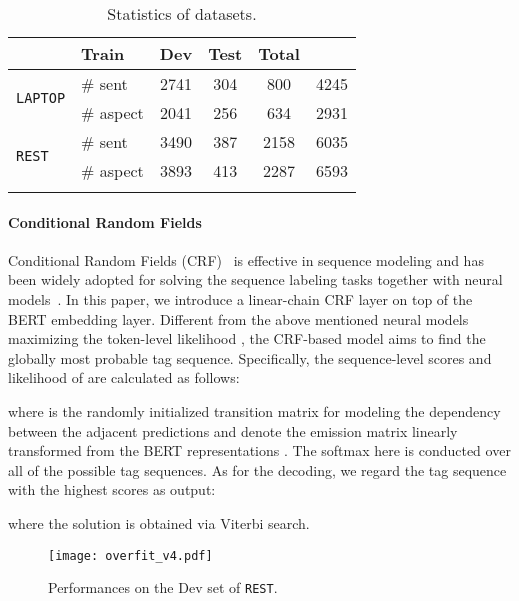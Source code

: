 \documentclass[11pt,a4paper]{article}
\begin{document}
\begin{table}[]
    \centering
    \begin{small}
    \begin{tabular}{ll|c|c|c|c}
    \Xhline{2\arrayrulewidth}
        \multicolumn{2}{c|}{Dataset} & Train & Dev & Test & Total  \\ \hline
         \multirow{2}{*}{\texttt{LAPTOP}} & \# sent & 2741 & 304 & 800 & 4245 \\ 
        & \# aspect & 2041 & 256 & 634 & 2931 \\ \hline
        \multirow{2}{*}{\texttt{REST}} & \# sent & 3490 & 387 & 2158 & 6035 \\ 
        & \# aspect & 3893 & 413 & 2287 & 6593 \\ 
    \Xhline{2\arrayrulewidth}
    \end{tabular}
    \end{small}
    \caption{Statistics of datasets.}
    \label{tab:dataset}
\end{table}

\paragraph{Conditional Random Fields} Conditional Random Fields (CRF)~\cite{lafferty2001conditional} is effective in sequence modeling and has been widely adopted for solving the sequence labeling tasks together with neural models~\cite{huang2015bidirectional,lample-etal-2016-neural,ma-hovy-2016-end}. In this paper, we introduce a linear-chain CRF layer on top of the BERT embedding layer. Different from the above mentioned neural models maximizing the token-level likelihood , the CRF-based model aims to find the globally most probable tag sequence. Specifically, the sequence-level scores  and likelihood  of  are calculated as follows:

where  is the randomly initialized transition matrix for modeling the dependency between the adjacent predictions and  denote the emission matrix linearly transformed from the BERT representations . The softmax here is conducted over all of the possible tag sequences. As for the decoding, we regard the tag sequence with the highest scores as output:

where the solution is obtained via Viterbi search.

\begin{figure}
\centering
    \texttt{[image: overfit\_v4.pdf]}
    \caption{Performances on the Dev set of \texttt{REST}.}
    \label{fig:overfit}
\end{figure}
\end{document}
